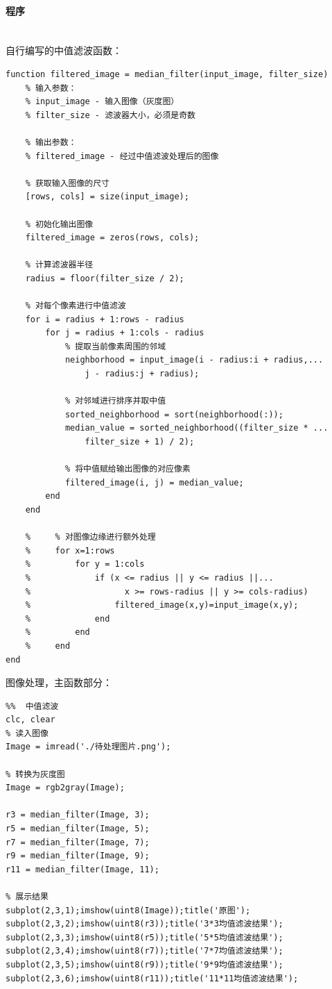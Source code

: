\documentclass[UTF8]{article}
\begin{document}
\paragraph{程序}~{}
\\
自行编写的中值滤波函数：
\begin{lstlisting}
function filtered_image = median_filter(input_image, filter_size)
    % 输入参数：
    % input_image - 输入图像（灰度图）
    % filter_size - 滤波器大小，必须是奇数

    % 输出参数：
    % filtered_image - 经过中值滤波处理后的图像

    % 获取输入图像的尺寸
    [rows, cols] = size(input_image);

    % 初始化输出图像
    filtered_image = zeros(rows, cols);

    % 计算滤波器半径
    radius = floor(filter_size / 2);

    % 对每个像素进行中值滤波
    for i = radius + 1:rows - radius
        for j = radius + 1:cols - radius
            % 提取当前像素周围的邻域
            neighborhood = input_image(i - radius:i + radius,...
                j - radius:j + radius);

            % 对邻域进行排序并取中值
            sorted_neighborhood = sort(neighborhood(:));
            median_value = sorted_neighborhood((filter_size * ...
                filter_size + 1) / 2);

            % 将中值赋给输出图像的对应像素
            filtered_image(i, j) = median_value;
        end
    end
    
    %     % 对图像边缘进行额外处理
    %     for x=1:rows
    %         for y = 1:cols
    %             if (x <= radius || y <= radius ||...
    %                   x >= rows-radius || y >= cols-radius)
    %                 filtered_image(x,y)=input_image(x,y);
    %             end
    %         end
    %     end
end
\end{lstlisting}

\noindent 图像处理，主函数部分：
\begin{lstlisting}
%%  中值滤波
clc, clear
% 读入图像
Image = imread('./待处理图片.png');

% 转换为灰度图
Image = rgb2gray(Image);

r3 = median_filter(Image, 3);
r5 = median_filter(Image, 5);
r7 = median_filter(Image, 7);
r9 = median_filter(Image, 9);
r11 = median_filter(Image, 11);

% 展示结果
subplot(2,3,1);imshow(uint8(Image));title('原图');
subplot(2,3,2);imshow(uint8(r3));title('3*3均值滤波结果');
subplot(2,3,3);imshow(uint8(r5));title('5*5均值滤波结果');
subplot(2,3,4);imshow(uint8(r7));title('7*7均值滤波结果');
subplot(2,3,5);imshow(uint8(r9));title('9*9均值滤波结果');
subplot(2,3,6);imshow(uint8(r11));title('11*11均值滤波结果');
\end{lstlisting}
\end{document}
